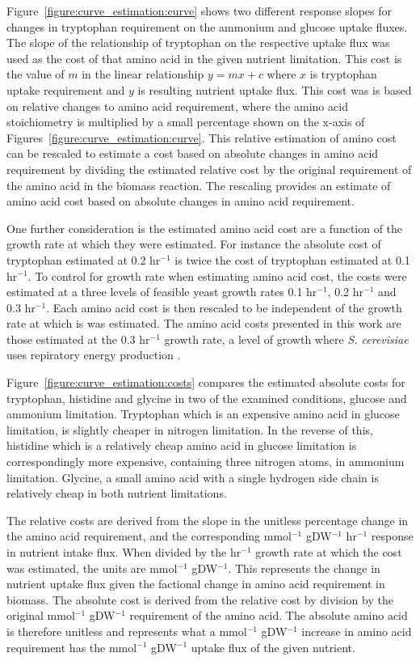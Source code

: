 Figure~\ref{figure:curve_estimation:curve} shows two different response slopes for changes in tryptophan requirement on the ammonium and glucose uptake fluxes. The slope of the relationship of tryptophan on the respective uptake flux was used as the cost of that amino acid in the given nutrient limitation. This cost is the value of $m$ in the linear relationship $y = mx + c$ where $x$ is tryptophan uptake requirement and $y$ is resulting nutrient uptake flux. This cost was is based on relative changes to amino acid requirement, where the  amino acid stoichiometry is multiplied by a small percentage shown on the x-axis of Figures~\vref{figure:curve_estimation:curve}. This relative estimation of amino cost can be rescaled to estimate a cost based on absolute changes in amino acid requirement by dividing the estimated relative cost by the original requirement of the amino acid in the biomass reaction. The rescaling provides an estimate of amino acid cost based on absolute changes in amino acid requirement. 

One further consideration is the estimated amino acid cost are a function of the growth rate at which they were estimated. For instance the absolute cost of tryptophan estimated at 0.2 hr$^{-1}$ is twice the cost of tryptophan estimated at 0.1 hr$^{-1}$. To control for growth rate when estimating amino acid cost, the costs were estimated at a three levels of feasible yeast growth rates 0.1 hr$^{-1}$, 0.2 hr$^{-1}$ and 0.3 hr$^{-1}$. Each amino acid cost is then rescaled to be independent of the growth rate at which is was estimated. The amino acid costs presented in this work are those estimated at the 0.3 hr$^{-1}$ growth rate, a level of growth where \emph{S. cerevisiae} uses repiratory energy production \cite{famili2003}.

Figure~\ref{figure:curve_estimation:costs} compares the estimated absolute costs for tryptophan, histidine and glycine in two of the examined conditions, glucose and ammonium limitation. Tryptophan which is an expensive amino acid in glucose limitation, is slightly cheaper in nitrogen limitation. In the reverse of this, histidine which is a relatively cheap amino acid in glucose limitation is correspondingly more expensive, containing three nitrogen atoms, in ammonium limitation. Glycine, a small amino acid with a single hydrogen side chain is relatively cheap in both nutrient limitations.

The relative costs are derived from the slope in the unitless percentage change in the amino acid requirement, and the corresponding mmol$^{-1}$ gDW$^{-1}$ hr$^{-1}$ response in nutrient intake flux. When divided by the hr$^{-1}$ growth rate at which the cost was estimated, the units are mmol$^{-1}$ gDW$^{-1}$. This represents the change in nutrient uptake flux given the factional change in amino acid requirement in biomass. The absolute cost is derived from the relative cost by division by the original mmol$^{-1}$ gDW$^{-1}$ requirement of the amino acid. The absolute amino acid is therefore unitless and represents what a mmol$^{-1}$ gDW$^{-1}$ increase in amino acid requirement has the mmol$^{-1}$ gDW$^{-1}$ uptake flux of the given nutrient.

